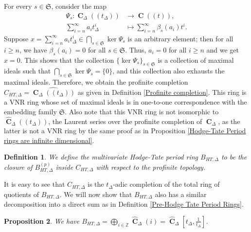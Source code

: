 \documentclass{amsart}
\newtheorem{proposition}{Proposition}[section]
\newtheorem{definition}[proposition]{Definition}
\newcommand{\mCHT}{C_{HT,\Delta}}
\DeclareMathOperator{\C}{\textbf{C}}
\newcommand{\mBHT}{B_{HT,\Delta}}
\newcommand{\pmBHT}{B^{(p)}_{HT,\Delta}}
\begin{document}
For every $s\in\mathfrak{S}$, consider the map
\begin{align*}
    \Psi_s:\C_\Delta(\!(t_\Delta)\!)&\to \C(\!(t)\!),\\
    \sum\limits_{i=n}^\infty a_it^i_\Delta&\mapsto \sum\limits_{i=n}^\infty\beta_s(a_i)t^i.
\end{align*}
Suppose $x=\sum\limits_{i=n}^\infty a_it^i_\Delta\in\bigcap\limits_{s\in\mathfrak{S}}\ker\Psi_s$ is an arbitrary element; then for all $i\geq n$, we have $\beta_s(a_i)=0$ for all $s\in\mathfrak{S}$. Thus, $a_i=0$ for all $i\geq n$ and we get $x=0$. This shows that the collection $\{\ker\Psi_s\}_{s\in\mathfrak{S}}$ is a collection of maximal ideals such that $\bigcap\limits_{s\in\mathfrak{S}}\ker\Psi_s=\{0\}$, and this collection also exhausts the maximal ideals. Therefore, we obtain the profinite completion $\mCHT=\widehat{\C_\Delta(\!(t_\Delta)\!)}$ as given in Definition \ref{Profinite completion}. This ring is a VNR ring whose set of maximal ideals is in one-to-one correspondence with the embedding family $\mathfrak{S}$. Also note that this VNR ring is not isomorphic to $\widehat{\C}_\Delta(\!(t_\Delta)\!)$, the Laurent series over the profinite completion of $\C_\Delta$, as the latter is not a VNR ring by the same proof as in Proposition \ref{Hodge-Tate Period rings are infinite dimensional}.\\

\begin{definition}
    We define the \emph{multivariate Hodge-Tate period ring} $\mBHT$ to be the closure of $\pmBHT$ inside $\mCHT$ with respect to the profinite topology.
\end{definition}

It is easy to see that $\mCHT$ is the $t_\Delta$-adic completion of the total ring of quotients of $\mBHT$. We will now show that $\mBHT$ also has a similar decomposition into a direct sum as in Definition \ref{Pre-Hodge Tate Period Rings}.

\begin{proposition}
    We have $\mBHT=\bigoplus\limits_{i\in\mathbb{Z}}\widehat{\C}_\Delta(i)=\widehat{\C}_\Delta\left[t_\Delta,\frac{1}{t_\Delta}\right]$.
\end{proposition}
\end{document}
